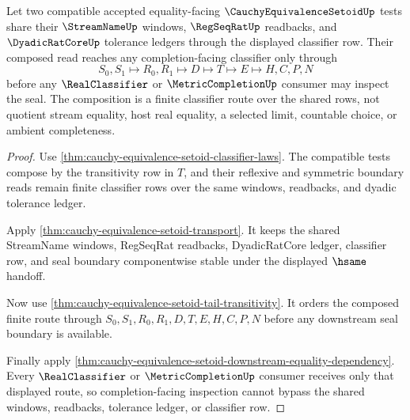 \begin{theorem}
\label{thm:cauchy-equivalence-setoid-completion-tail-composition}
Let two compatible accepted equality-facing $\CauchyEquivalenceSetoidUp$ tests share their $\StreamNameUp$ windows, $\RegSeqRatUp$ readbacks, and $\DyadicRatCoreUp$ tolerance ledgers through the displayed classifier row. Their composed read reaches any completion-facing classifier only through
$$
S_0,S_1 \longmapsto R_0,R_1 \longmapsto D \longmapsto T \longmapsto E \longmapsto H,C,P,N
$$
before any $\RealClassifier$ or $\MetricCompletionUp$ consumer may inspect the seal. The composition is a finite classifier route over the shared rows, not quotient stream equality, host real equality, a selected limit, countable choice, or ambient completeness.
\end{theorem}
\begin{proof}
Use \autoref{thm:cauchy-equivalence-setoid-classifier-laws}. The compatible tests compose by the transitivity row in $T$, and their reflexive and symmetric boundary reads remain finite classifier rows over the same windows, readbacks, and dyadic tolerance ledger.

Apply \autoref{thm:cauchy-equivalence-setoid-transport}. It keeps the shared StreamName windows, RegSeqRat readbacks, DyadicRatCore ledger, classifier row, and seal boundary componentwise stable under the displayed $\hsame$ handoff.

Now use \autoref{thm:cauchy-equivalence-setoid-tail-transitivity}. It orders the composed finite route through $S_0,S_1,R_0,R_1,D,T,E,H,C,P,N$ before any downstream seal boundary is available.

Finally apply \autoref{thm:cauchy-equivalence-setoid-downstream-equality-dependency}. Every $\RealClassifier$ or $\MetricCompletionUp$ consumer receives only that displayed route, so completion-facing inspection cannot bypass the shared windows, readbacks, tolerance ledger, or classifier row.
\end{proof}

